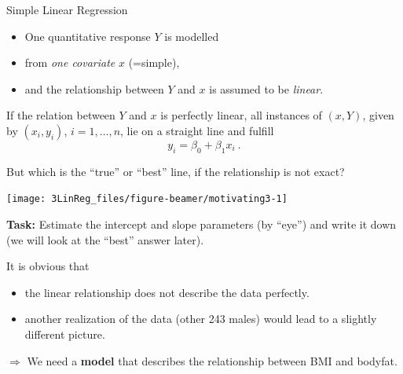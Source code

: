 \documentclass[10pt,ignorenonframetext,]{beamer}
\providecommand{\tightlist}{%
  \setlength{\itemsep}{0pt}\setlength{\parskip}{0pt}}
\begin{document}
\begin{frame}{Simple Linear Regression}

\begin{itemize}
\item
  One quantitative response \(Y\) is modelled
\item
  from \emph{one covariate} \(x\) (=simple),
\item
  and the relationship between \(Y\) and \(x\) is assumed to be
  \emph{linear}.
\end{itemize}

\vspace{6mm} If the relation between \(Y\) and \(x\) is perfectly
linear, all instances of \((x,Y)\), given by \((x_i,y_i)\),
\(i= 1,\ldots, n\), lie on a straight line and fulfill
\[y_i = \beta_0 + \beta_1 x_i\ .\]

\end{frame}

\begin{frame}

But which is the ``true'' or ``best'' line, if the relationship is not
exact?

\begin{center}\texttt{[image: 3LinReg\_files/figure-beamer/motivating3-1]} \end{center}

\textbf{Task:} Estimate the intercept and slope parameters (by ``eye'')
and write it down (we will look at the ``best'' answer later).

\end{frame}

\begin{frame}

It is obvious that

\begin{itemize}
\tightlist
\item
  the linear relationship does not describe the data perfectly.
\item
  another realization of the data (other 243 males) would lead to a
  slightly different picture.
\end{itemize}

\vspace{4mm} \(\Rightarrow\) We need a \textbf{model} that describes the
relationship between BMI and bodyfat.

\end{frame}
\end{document}
